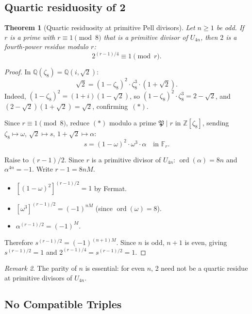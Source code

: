 \documentclass[12pt]{article}
\theoremstyle{plain}
\newtheorem{theorem}{Theorem}[section]
\theoremstyle{definition}
\theoremstyle{remark}
\newtheorem{remark}[theorem]{Remark}
\begin{document}
\subsection{Quartic residuosity of 2}


\begin{theorem}[Quartic residuosity at primitive Pell divisors]\label{thm:quartic-residuosity}
Let \(n \geq 1\) be odd. If \(r\) is a prime with
\(r \equiv 1 \pmod{8}\) that is a primitive divisor of \(U_{4n}\),
then \(2\) is a fourth-power residue modulo \(r\):
\[
2^{(r-1)/4} \equiv 1 \pmod{r}.
\]
\end{theorem}


\begin{proof}
In \(\mathbb{Q}(\zeta_8) = \mathbb{Q}(i, \sqrt{2})\):
\[
\sqrt{2} = (1 - \zeta_8)^2 \cdot \zeta_8^3 \cdot (1 + \sqrt{2}).
\tag{$\ast$}
\]
Indeed, \((1-\zeta_8)^2 = (1+i)(1-\sqrt{2})\),
so \((1-\zeta_8)^2 \cdot \zeta_8^3 = 2 - \sqrt{2}\), and
\((2 - \sqrt{2})(1+\sqrt{2}) = \sqrt{2}\), confirming~\((\ast)\).

Since \(r \equiv 1 \pmod{8}\), reduce \((\ast)\) modulo a prime
\(\mathfrak{P} \mid r\) in \(\mathbb{Z}[\zeta_8]\), sending
\(\zeta_8 \mapsto \omega\), \(\sqrt{2} \mapsto s\),
\(1+\sqrt{2} \mapsto \alpha\):
\[
s = (1-\omega)^2 \cdot \omega^3 \cdot \alpha \quad\text{in }
\mathbb{F}_r.  \tag{$\ast\ast$}
\]

Raise to \((r-1)/2\). Since \(r\) is a primitive divisor of
\(U_{4n}\): \(\operatorname{ord}(\alpha) = 8n\) and
\(\alpha^{4n} = -1\). Write \(r - 1 = 8nM\).

\begin{itemize}
\item \([(1-\omega)^2]^{(r-1)/2} = 1\) by Fermat.
\item \([\omega^3]^{(r-1)/2} = (-1)^{nM}\)
  (since \(\operatorname{ord}(\omega) = 8\)).
\item \(\alpha^{(r-1)/2} = (-1)^M\).
\end{itemize}

Therefore \(s^{(r-1)/2} = (-1)^{(n+1)M}\). Since \(n\) is odd,
\(n+1\) is even, giving \(s^{(r-1)/2} = 1\) and
\(2^{(r-1)/4} = s^{(r-1)/2} = 1\).
\end{proof}
\begin{remark}
The parity of \(n\) is essential: for even \(n\),
2 need not be a quartic residue at primitive divisors of \(U_{4n}\).
\end{remark}

\subsection{No Compatible Triples}\label{sec:nct}
\end{document}

